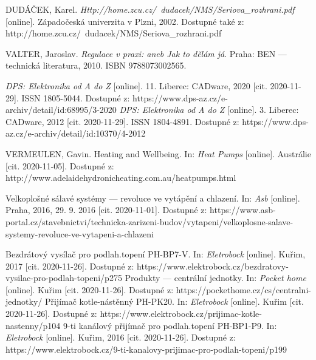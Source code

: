 \begin{thebibliography}{3}
DUDÁČEK, Karel. \textit{Http://home.zcu.cz/~dudacek/NMS/Seriova\_rozhrani.pdf} [online]. Západočeská univerzita v Plzni, 2002. Dostupné také z: http://home.zcu.cz/~dudacek/NMS/Seriova\_rozhrani.pdf


VALTER, Jaroslav. \textit{Regulace v praxi: aneb Jak to dělám já}. Praha: BEN --- technická literatura, 2010. ISBN 9788073002565.

\textit{DPS: Elektronika od A do Z} [online]. 11. Liberec: CADware, 2020 [cit. 2020-11-29]. ISSN 1805-5044. Dostupné z: https://www.dps-az.cz/e-archiv/detail/id:68995/3-2020
\textit{DPS: Elektronika od A do Z} [online]. 3. Liberec: CADware, 2012 [cit. 2020-11-29]. ISSN 1804-4891. Dostupné z: https://www.dps-az.cz/e-archiv/detail/id:10370/4-2012


VERMEULEN, Gavin. Heating and Wellbeing. In: \textit{Heat Pumps} [online]. Austrálie [cit. 2020-11-05]. Dostupné z: http://www.adelaidehydronicheating.com.au/heatpumps.html

Velkoplošné sálavé systémy --- revoluce ve vytápění a chlazení. In: \textit{Asb} [online]. Praha, 2016, 29. 9. 2016 [cit. 2020-11-01]. Dostupné z: https://www.asb-portal.cz/stavebnictvi/technicka-zarizeni-budov/vytapeni/velkoplosne-salave-systemy-revoluce-ve-vytapeni-a-chlazeni

Bezdrátový vysílač pro podlah.topení PH-BP7-V. In: \textit{Eletrobock} [online]. Kuřim, 2017 [cit. 2020-11-26]. Dostupné z: https://www.elektrobock.cz/bezdratovy-vysilac-pro-podlah-topeni/p275
Produkty --- centrální jednotky. In: \textit{Pocket home} [online]. Kuřim [cit. 2020-11-26]. Dostupné z: https://pockethome.cz/cs/centralni-jednotky/
Přijímač kotle-nástěnný PH-PK20. In: \textit{Eletrobock} [online]. Kuřim [cit. 2020-11-26]. Dostupné z: https://www.elektrobock.cz/prijimac-kotle-nastenny/p104
9-ti kanálový přijímač pro podlah.topení PH-BP1-P9. In: \textit{Eletrobock} [online]. Kuřim, 2016 [cit. 2020-11-26]. Dostupné z: https://www.elektrobock.cz/9-ti-kanalovy-prijimac-pro-podlah-topeni/p199


\end{thebibliography}
